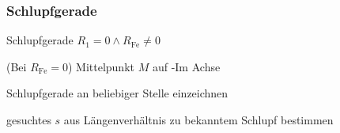 \begin{sectionbox}
\subsubsection{Schlupfgerade}
\begin{cookbox}{Schlupfgerade $R_1 = 0\wedge R_\text{Fe}\neq 0$}
\item (Bei $R_\text{Fe} = 0$) Mittelpunkt $M$ auf -Im Achse
\item Schlupfgerade an beliebiger Stelle einzeichnen
\item gesuchtes $s$ aus Längenverhältnis zu bekanntem Schlupf bestimmen
\end{cookbox}

\end{sectionbox}

